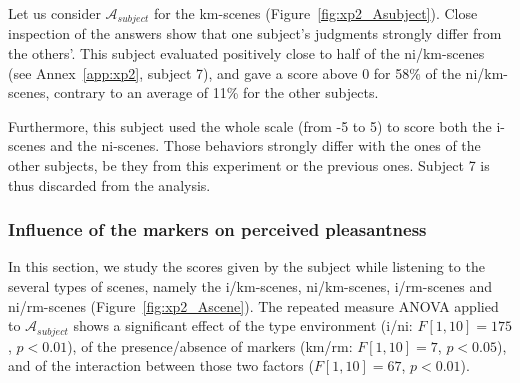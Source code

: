 \documentclass[12pt]{elsarticle}
\begin{document}
Let us consider $\mathcal{A}_{subject}$ for the km-scenes (Figure~\ref{fig:xp2_Asubject}). Close inspection of the answers show that one subject's judgments strongly differ from the others'. This subject evaluated positively close to half of the ni/km-scenes (see Annex~\ref{app:xp2}, subject 7), and gave a score above 0 for 58\% of the ni/km-scenes, contrary to an average of 11\% for the other subjects.

Furthermore, this subject used the whole scale (from -5 to 5) to score both the i-scenes and the ni-scenes. Those behaviors strongly differ with the ones of the other subjects, be they from this experiment or the previous ones. Subject 7 is thus discarded from the analysis.

\subsubsection{Influence of the markers on perceived pleasantness}


In this section, we study the scores given by the subject while listening to the several types of scenes, namely the i/km-scenes, ni/km-scenes, i/rm-scenes and ni/rm-scenes (Figure~\ref{fig:xp2_Ascene}). The repeated measure ANOVA applied to $\mathcal{A}_{subject}$ shows a significant effect of the type environment (i/ni: $F[1,10]=175$, $p<0.01$), of the presence/absence of markers (km/rm: $F[1,10]=7$, $p<0.05$), and of the interaction between those two factors ($F[1,10]=67$, $p<0.01$).


\end{document}
